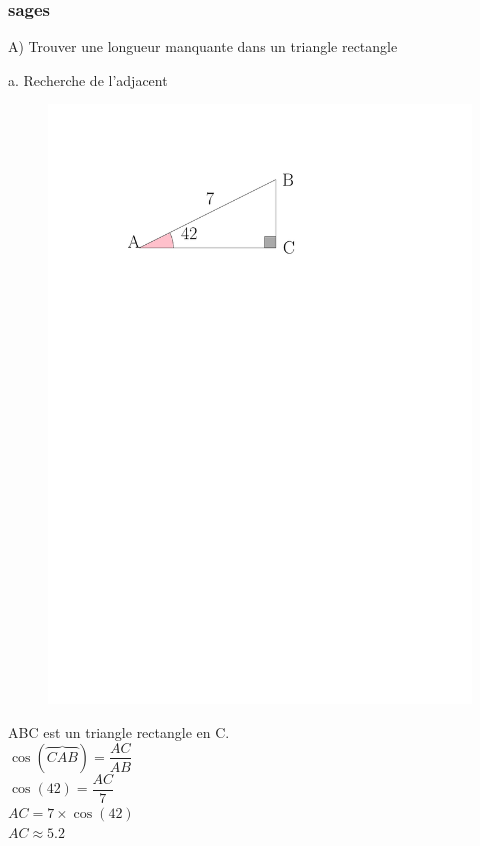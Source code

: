 \documentclass{beamer}
\begin{document}
\begin{frame}
  \frametitle{{}sages}

  A) Trouver une longueur manquante dans un triangle rectangle
  
  \begin{exampleblock}{a. Recherche de l'adjacent}
    
    \begin{multicols}{2}
      \begin{figure}[H]
	      \centering
	      \includegraphics[width=\linewidth]{sources/2/rec-a1.pdf}
	    \end{figure}
      
      \vspace{.5cm}
      
      ABC est un triangle rectangle en C.\\
      
      $\cos(\overbrace{CAB}) = \dfrac{AC}{AB}$\\
      $\cos(42) = \dfrac{AC}{7}$\\
      $AC = 7 \times \cos(42)$\\
      $AC \approx 5.2$
      
    \end{multicols}
  \end{exampleblock}
  
\end{frame}
\end{document}
